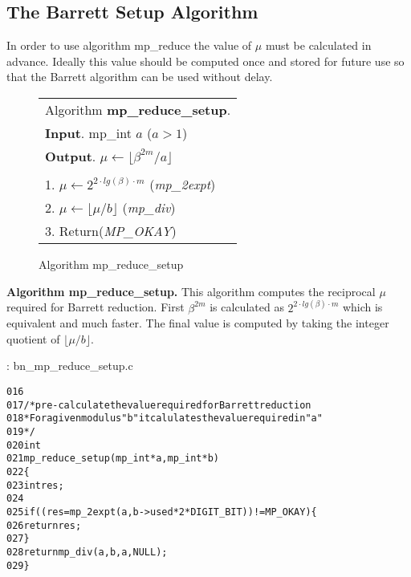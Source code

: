 \documentclass[b5paper]{book}
\begin{document}
\subsection{The Barrett Setup Algorithm}
In order to use algorithm mp\_reduce the value of $\mu$ must be calculated in advance.  Ideally this value should be computed once and stored for
future use so that the Barrett algorithm can be used without delay.  

\begin{figure}[!here]
\begin{small}
\begin{center}
\begin{tabular}{l}
\hline Algorithm \textbf{mp\_reduce\_setup}. \\
\textbf{Input}.   mp\_int $a$ ($a > 1$)  \\
\textbf{Output}.  $\mu \leftarrow \lfloor \beta^{2m}/a \rfloor$ \\
\hline \\
1.  $\mu \leftarrow 2^{2 \cdot lg(\beta) \cdot  m}$ (\textit{mp\_2expt}) \\
2.  $\mu \leftarrow \lfloor \mu / b \rfloor$ (\textit{mp\_div}) \\
3.  Return(\textit{MP\_OKAY}) \\
\hline
\end{tabular}
\end{center}
\end{small}
\caption{Algorithm mp\_reduce\_setup}
\end{figure}

\textbf{Algorithm mp\_reduce\_setup.}
This algorithm computes the reciprocal $\mu$ required for Barrett reduction.  First $\beta^{2m}$ is calculated as $2^{2 \cdot lg(\beta) \cdot  m}$ which
is equivalent and much faster.  The final value is computed by taking the integer quotient of $\lfloor \mu / b \rfloor$.

\vspace{+3mm}\begin{small}
\hspace{-5.1mm}{\bf File}: bn\_mp\_reduce\_setup.c
\vspace{-3mm}
\begin{alltt}
016   
017   /* pre-calculate the value required for Barrett reduction
018    * For a given modulus "b" it calulates the value required in "a"
019    */
020   int
021   mp_reduce_setup (mp_int * a, mp_int * b)
022   \{
023     int     res;
024     
025     if ((res = mp_2expt (a, b->used * 2 * DIGIT_BIT)) != MP_OKAY) \{
026       return res;
027     \}
028     return mp_div (a, b, a, NULL);
029   \}
\end{alltt}
\end{small}
\end{document}
